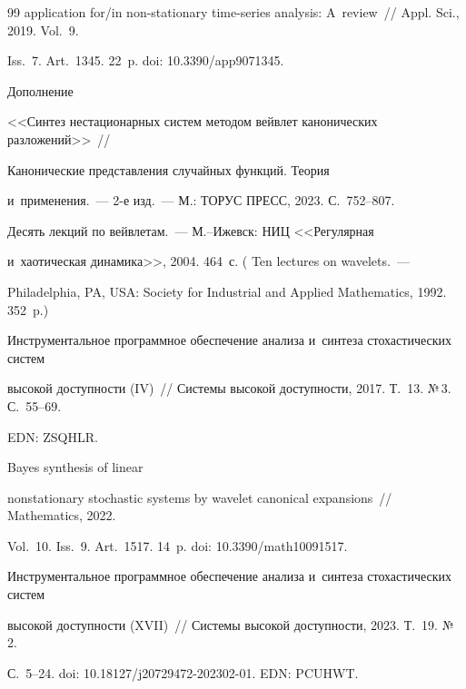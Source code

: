 {{\begin{thebibliography}{99}
application for/in non-stationary time-series analysis: A~review~/\!\!/ Appl. Sci., 2019. Vol.~9. 


Iss.~7. Art.~1345. 22~p. doi: 10.3390\!/\!app9071345. 




 Дополнение 


<<Синтез нестационарных систем методом вейвлет канонических разложений>>~/\!\!/


 Канонические пред\-став\-ле\-ния случайных функций. Теория 


и~применения.~--- 2-е изд.~--- М.: ТОРУС ПРЕСС, 2023. С.~752--807.




 Десять лекций по вейвлетам.~--- М.--Ижевск: НИЦ <<Регулярная 


и~хаотическая динамика>>, 2004. 464~с. ( Ten lectures on wavelets.~--- 


Philadelphia, PA, USA: Society for Industrial and Applied Mathematics, 1992. 352~p.)






Инструментальное программное обеспечение анализа и~синтеза стохастических систем 


высокой доступности (IV)~/\!\!/ Системы высокой доступности, 2017. Т.~13. №\,3. С.~55--69. 


EDN: ZSQHLR.




 Bayes synthesis of linear 


nonstationary stochastic systems by wavelet canonical expansions~/\!\!/ Mathematics, 2022. 


Vol.~10. Iss.~9. Art.~1517. 14~p. doi: 10.3390\!/\!math10091517.






Инструментальное программное обеспечение анализа и~синтеза стохастических сис\-тем 


высокой доступности (XVII)~/\!\!/ Системы высокой доступности, 2023. Т.~19. №\,2.  


С.~5--24. doi: 10.18127\!/\!j20729472-202302-01. EDN: PCUHWT.



\end{thebibliography}}}
